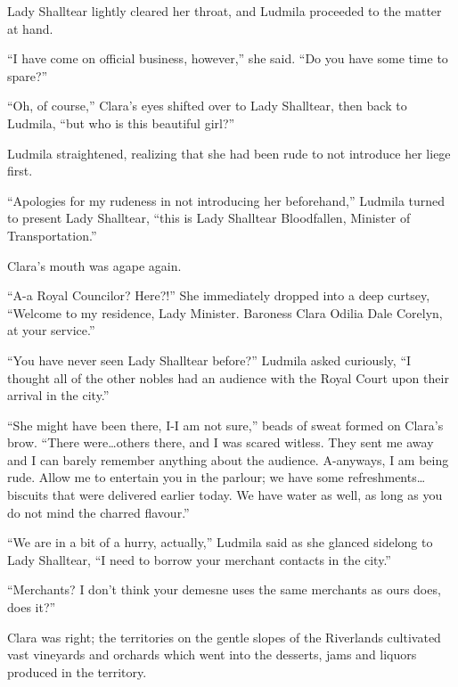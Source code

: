  

Lady Shalltear lightly cleared her throat, and Ludmila proceeded to the matter at hand.

 

“I have come on official business, however,” she said. “Do you have some time to spare?”

 

“Oh, of course,” Clara’s eyes shifted over to Lady Shalltear, then back to Ludmila, “but who is this beautiful girl?”

 

Ludmila straightened, realizing that she had been rude to not introduce her liege first.

 

“Apologies for my rudeness in not introducing her beforehand,” Ludmila turned to present Lady Shalltear, “this is Lady Shalltear Bloodfallen, Minister of Transportation.”

 

Clara’s mouth was agape again.

 

“A-a Royal Councilor? Here?!” She immediately dropped into a deep curtsey, “Welcome to my residence, Lady Minister. Baroness Clara Odilia Dale Corelyn, at your service.”

 

“You have never seen Lady Shalltear before?” Ludmila asked curiously, “I thought all of the other nobles had an audience with the Royal Court upon their arrival in the city.”

 

“She might have been there, I-I am not sure,” beads of sweat formed on Clara’s brow. “There were…others there, and I was scared witless. They sent me away and I can barely remember anything about the audience. A-anyways, I am being rude. Allow me to entertain you in the parlour; we have some refreshments…biscuits that were delivered earlier today. We have water as well, as long as you do not mind the charred flavour.”

 

“We are in a bit of a hurry, actually,” Ludmila said as she glanced sidelong to Lady Shalltear, “I need to borrow your merchant contacts in the city.”

 

“Merchants? I don’t think your demesne uses the same merchants as ours does, does it?”

 

Clara was right; the territories on the gentle slopes of the Riverlands cultivated vast vineyards and orchards which went into the desserts, jams and liquors produced in the territory.

